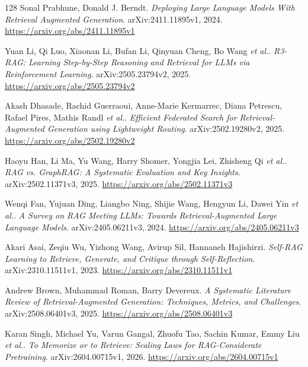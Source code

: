 \documentclass[11pt,a4paper]{article}
\begin{document}
\begin{thebibliography}{128}
Sonal Prabhune, Donald J. Berndt.
\newblock \emph{Deploying Large Language Models With Retrieval Augmented Generation}.
\newblock arXiv:2411.11895v1, 2024.
\newblock \url{https://arxiv.org/abs/2411.11895v1}

Yuan Li, Qi Luo, Xiaonan Li, Bufan Li, Qinyuan Cheng, Bo Wang \emph{et al.}.
\newblock \emph{R3-RAG: Learning Step-by-Step Reasoning and Retrieval for LLMs via Reinforcement Learning}.
\newblock arXiv:2505.23794v2, 2025.
\newblock \url{https://arxiv.org/abs/2505.23794v2}

Akash Dhasade, Rachid Guerraoui, Anne-Marie Kermarrec, Diana Petrescu, Rafael Pires, Mathis Randl \emph{et al.}.
\newblock \emph{Efficient Federated Search for Retrieval-Augmented Generation using Lightweight Routing}.
\newblock arXiv:2502.19280v2, 2025.
\newblock \url{https://arxiv.org/abs/2502.19280v2}

Haoyu Han, Li Ma, Yu Wang, Harry Shomer, Yongjia Lei, Zhisheng Qi \emph{et al.}.
\newblock \emph{RAG vs. GraphRAG: A Systematic Evaluation and Key Insights}.
\newblock arXiv:2502.11371v3, 2025.
\newblock \url{https://arxiv.org/abs/2502.11371v3}

Wenqi Fan, Yujuan Ding, Liangbo Ning, Shijie Wang, Hengyun Li, Dawei Yin \emph{et al.}.
\newblock \emph{A Survey on RAG Meeting LLMs: Towards Retrieval-Augmented Large Language Models}.
\newblock arXiv:2405.06211v3, 2024.
\newblock \url{https://arxiv.org/abs/2405.06211v3}

Akari Asai, Zeqiu Wu, Yizhong Wang, Avirup Sil, Hannaneh Hajishirzi.
\newblock \emph{Self-RAG Learning to Retrieve, Generate, and Critique through Self-Reflection}.
\newblock arXiv:2310.11511v1, 2023.
\newblock \url{https://arxiv.org/abs/2310.11511v1}

Andrew Brown, Muhammad Roman, Barry Devereux.
\newblock \emph{A Systematic Literature Review of Retrieval-Augmented Generation: Techniques, Metrics, and Challenges}.
\newblock arXiv:2508.06401v3, 2025.
\newblock \url{https://arxiv.org/abs/2508.06401v3}

Karan Singh, Michael Yu, Varun Gangal, Zhuofu Tao, Sachin Kumar, Emmy Liu \emph{et al.}.
\newblock \emph{To Memorize or to Retrieve: Scaling Laws for RAG-Considerate Pretraining}.
\newblock arXiv:2604.00715v1, 2026.
\newblock \url{https://arxiv.org/abs/2604.00715v1}


\end{thebibliography}
\end{document}

